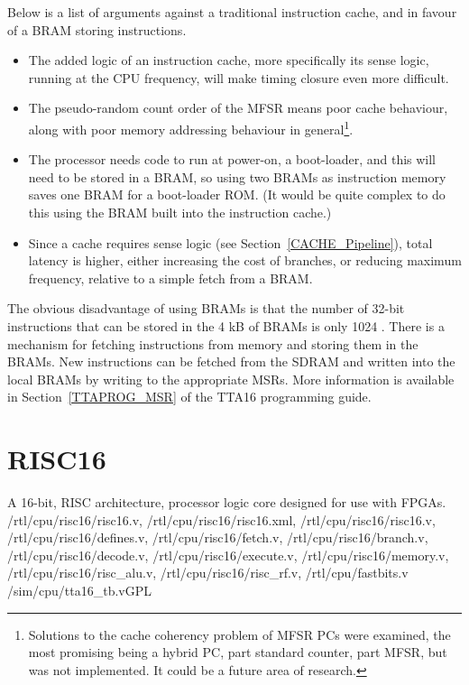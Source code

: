 Below is a list of arguments against a traditional instruction cache, and in
favour of a BRAM storing instructions.
\begin{itemize}
  \item The added logic of an instruction cache, more specifically its sense
  logic, running at the CPU frequency, will make timing closure even more
  difficult.
  \item The pseudo-random count order of the MFSR means poor cache behaviour,
  along with poor memory addressing behaviour in general\footnote{Solutions to
  the cache coherency problem of MFSR PCs were examined, the most promising
  being a hybrid PC, part standard counter, part MFSR, but was not implemented.
  It could be a future area of research.}.
  \item The processor needs code to run at power-on, a boot-loader, and this
  will need to be stored in a BRAM, so using two BRAMs as instruction memory
  saves one BRAM for a boot-loader ROM. (It would be quite complex to do this
  using the BRAM built into the instruction cache.)
  \item Since a cache requires sense logic (see Section~\ref{CACHE_Pipeline}),
  total latency is higher, either increasing the cost of branches, or reducing
  maximum frequency, relative to a simple fetch from a BRAM.
\end{itemize}

The obvious disadvantage of using BRAMs is that the number of 32-bit
instructions that can be stored in the 4 kB of BRAMs is only 1024 . There
is a mechanism for fetching instructions from memory and storing them in the
BRAMs. New instructions can be fetched from the SDRAM and written into the
local BRAMs by writing to the appropriate MSRs. More information is available
in Section~\ref{TTAPROG_MSR} of the TTA16 programming guide.



\section{RISC16}
\label{RISC16}

{A 16-bit, RISC architecture, processor logic core designed for use with FPGAs.}
{/rtl/cpu/risc16/risc16.v, /rtl/cpu/risc16/risc16.xml, /rtl/cpu/risc16/risc16.v,
/rtl/cpu/risc16/defines.v, /rtl/cpu/risc16/fetch.v, /rtl/cpu/risc16/branch.v,
/rtl/cpu/risc16/decode.v, /rtl/cpu/risc16/execute.v, /rtl/cpu/risc16/memory.v,
/rtl/cpu/risc16/risc\_alu.v, /rtl/cpu/risc16/risc\_rf.v, /rtl/cpu/fastbits.v}
{/sim/cpu/tta16\_tb.v}{GPL}

